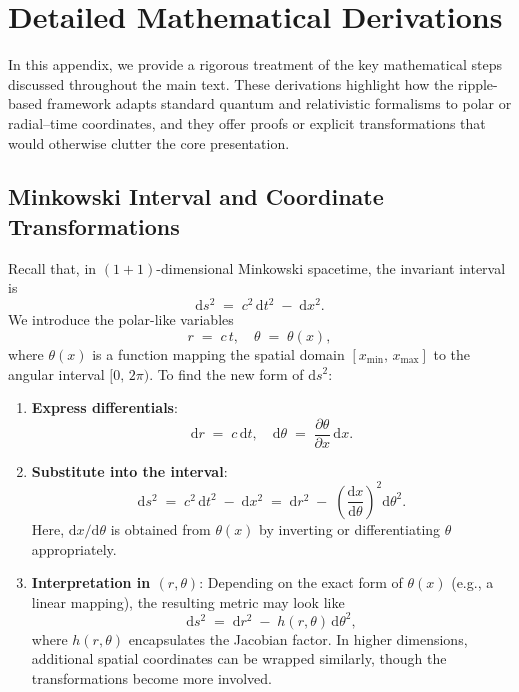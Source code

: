 \documentclass[11pt]{article}
\begin{document}
\appendix
\section{Detailed Mathematical Derivations}
\label{app:derivations}

In this appendix, we provide a rigorous treatment of the key mathematical steps 
discussed throughout the main text. These derivations highlight how the 
ripple-based framework adapts standard quantum and relativistic formalisms 
to polar or radial--time coordinates, and they offer proofs or explicit 
transformations that would otherwise clutter the core presentation.

\subsection{Minkowski Interval and Coordinate Transformations}
\label{app:sec:minkowski-coord}
Recall that, in \((1+1)\)-dimensional Minkowski spacetime, the invariant interval is 
\[
  \mathrm{d}s^2 \;=\; c^2\,\mathrm{d}t^2 \;-\; \mathrm{d}x^2.
\]
We introduce the polar-like variables
\[
  r \;=\; c \, t, \quad \theta \;=\; \theta(x),
\]
where $\theta(x)$ is a function mapping the spatial domain \([x_{\min},\,x_{\max}]\) 
to the angular interval $[0,\,2\pi)$. To find the new form of $\mathrm{d}s^2$:

\begin{enumerate}
  \item \textbf{Express differentials}: 
    \[
      \mathrm{d}r \;=\; c\, \mathrm{d}t, 
      \quad
      \mathrm{d}\theta \;=\; \frac{\partial \theta}{\partial x}\,\mathrm{d}x.
    \]

  \item \textbf{Substitute into the interval}: 
    \[
      \mathrm{d}s^2 \;=\; c^2\,\mathrm{d}t^2 \;-\;\mathrm{d}x^2 
      \;=\; \mathrm{d}r^2 \;-\;\left(\frac{\mathrm{d}x}{\mathrm{d}\theta}\right)^2 
      \!\!\mathrm{d}\theta^2.
    \]
    Here, $\mathrm{d}x / \mathrm{d}\theta$ is obtained from $\theta(x)$ 
    by inverting or differentiating $\theta$ appropriately.

  \item \textbf{Interpretation in $(r, \theta)$}: 
    Depending on the exact form of $\theta(x)$ (e.g., a linear mapping), 
    the resulting metric may look like
    \[
      \mathrm{d}s^2 
      \;=\; \mathrm{d}r^2 
           \;-\; h(r,\theta)\,\mathrm{d}\theta^2,
    \]
    where $h(r,\theta)$ encapsulates the Jacobian factor. 
    In higher dimensions, additional spatial coordinates can be wrapped 
    similarly, though the transformations become more involved.
\end{enumerate}
\end{document}
